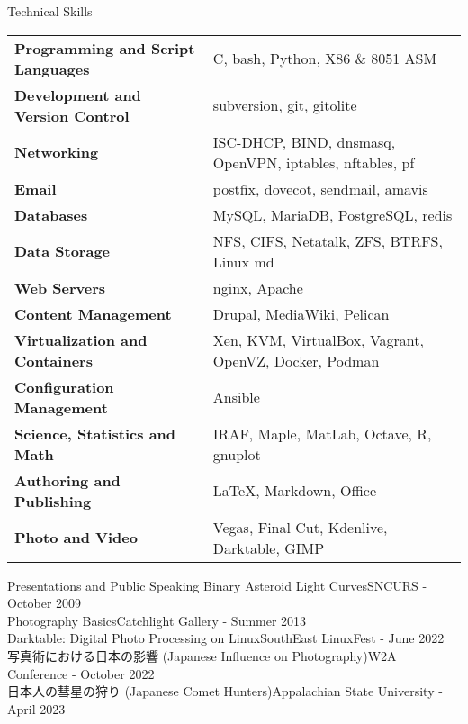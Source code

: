 \documentclass{cv} %
\begin{document}

\begin{rSection}{Technical Skills}

\begin{tabular}{ @{} >{\bfseries}l @{\hspace{6ex}} l }
Programming and Script Languages & C, bash, Python, X86 \& 8051 ASM \\
Development and Version Control & subversion, git, gitolite \\
Networking & ISC-DHCP, BIND, dnsmasq, OpenVPN, iptables, nftables, pf\\
Email & postfix, dovecot, sendmail, amavis\\
Databases & MySQL, MariaDB, PostgreSQL, redis  \\
Data Storage & NFS, CIFS, Netatalk, ZFS, BTRFS, Linux md\\
Web Servers & nginx, Apache\\
Content Management & Drupal, MediaWiki, Pelican\\
Virtualization and Containers & Xen, KVM, VirtualBox, Vagrant, OpenVZ, Docker, Podman \\
Configuration Management & Ansible \\ 
Science, Statistics and Math & IRAF, Maple, MatLab, Octave, R, gnuplot\\
Authoring and Publishing & \LaTeX, Markdown, Office\\
Photo and Video & Vegas, Final Cut, Kdenlive, Darktable, GIMP\\
\end{tabular}
\end{rSection}

\begin{rSection}
{Presentations and Public Speaking}
{Binary Asteroid Light Curves}\hfill{SNCURS - October 2009}\\
{Photography Basics}\hfill{Catchlight Gallery - Summer 2013}\\
{Darktable: Digital Photo Processing on Linux}\hfill{SouthEast LinuxFest - June 2022}\\
{写真術における日本の影響 (Japanese Influence on Photography)}\hfill{W2A Conference - October 2022}\\
{日本人の彗星の狩り (Japanese Comet Hunters)}\hfill{Appalachian State University - April 2023}

\end{rSection}
\end{document}
